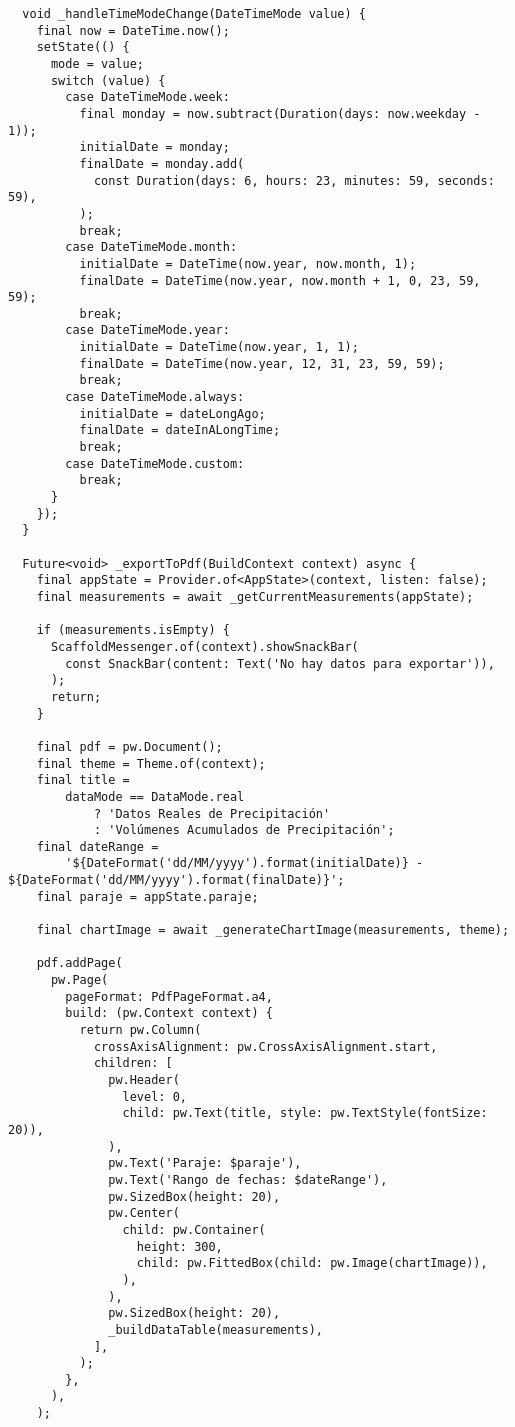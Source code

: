 \begin{verbatim}
  void _handleTimeModeChange(DateTimeMode value) {
    final now = DateTime.now();
    setState(() {
      mode = value;
      switch (value) {
        case DateTimeMode.week:
          final monday = now.subtract(Duration(days: now.weekday - 1));
          initialDate = monday;
          finalDate = monday.add(
            const Duration(days: 6, hours: 23, minutes: 59, seconds: 59),
          );
          break;
        case DateTimeMode.month:
          initialDate = DateTime(now.year, now.month, 1);
          finalDate = DateTime(now.year, now.month + 1, 0, 23, 59, 59);
          break;
        case DateTimeMode.year:
          initialDate = DateTime(now.year, 1, 1);
          finalDate = DateTime(now.year, 12, 31, 23, 59, 59);
          break;
        case DateTimeMode.always:
          initialDate = dateLongAgo;
          finalDate = dateInALongTime;
          break;
        case DateTimeMode.custom:
          break;
      }
    });
  }

  Future<void> _exportToPdf(BuildContext context) async {
    final appState = Provider.of<AppState>(context, listen: false);
    final measurements = await _getCurrentMeasurements(appState);

    if (measurements.isEmpty) {
      ScaffoldMessenger.of(context).showSnackBar(
        const SnackBar(content: Text('No hay datos para exportar')),
      );
      return;
    }

    final pdf = pw.Document();
    final theme = Theme.of(context);
    final title =
        dataMode == DataMode.real
            ? 'Datos Reales de Precipitación'
            : 'Volúmenes Acumulados de Precipitación';
    final dateRange =
        '${DateFormat('dd/MM/yyyy').format(initialDate)} - ${DateFormat('dd/MM/yyyy').format(finalDate)}';
    final paraje = appState.paraje;

    final chartImage = await _generateChartImage(measurements, theme);

    pdf.addPage(
      pw.Page(
        pageFormat: PdfPageFormat.a4,
        build: (pw.Context context) {
          return pw.Column(
            crossAxisAlignment: pw.CrossAxisAlignment.start,
            children: [
              pw.Header(
                level: 0,
                child: pw.Text(title, style: pw.TextStyle(fontSize: 20)),
              ),
              pw.Text('Paraje: $paraje'),
              pw.Text('Rango de fechas: $dateRange'),
              pw.SizedBox(height: 20),
              pw.Center(
                child: pw.Container(
                  height: 300,
                  child: pw.FittedBox(child: pw.Image(chartImage)),
                ),
              ),
              pw.SizedBox(height: 20),
              _buildDataTable(measurements),
            ],
          );
        },
      ),
    );


\end{verbatim}
